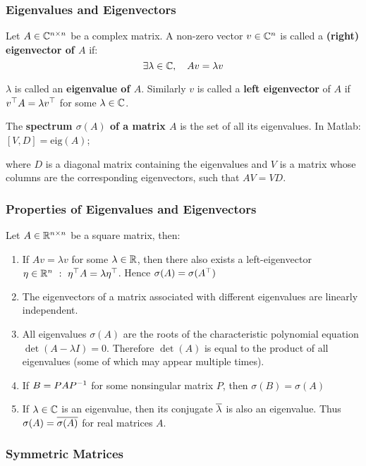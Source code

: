 \subsubsection{Eigenvalues and Eigenvectors}%
\label{ssub:eigenvalues_and_eigenvectors}

Let $A \in \mathbb{C}^{n \times n}$ be a complex matrix.
A non-zero vector $v \in \mathbb{C}^n$ is called a \textbf{(right) eigenvector of $A$} if:
	\[\exists \lambda \in \mathbb{C}, \quad Av = \lambda v\]

$\lambda$ is called an \textbf{eigenvalue of $A$}.
Similarly $v$ is called a \textbf{left eigenvector} of $A$ if
$v^{\top}A = \lambda v^{\top}$ for some $\lambda \in \mathbb{C}$.

The \textbf{spectrum $\sigma(A)$ of a matrix $A$} is the set of all its eigenvalues.
In Matlab: $[V,D] = \text{eig} (A)$;

where $D$ is a diagonal matrix containing the eigenvalues and
$V$ is a matrix whose columns are the corresponding eigenvectors,
such that $AV = VD$.


\subsubsection{Properties of Eigenvalues and Eigenvectors}%
\label{ssub:properties_of_eigenvalues_and_eigenvectors}

Let $A \in \mathbb{R}^{n \times n}$ be a square matrix, then:
\begin{enumerate}
	\item If $Av = \lambda v$ for some $\lambda \in \mathbb{R}$, then there also exists a
		left-eigenvector $\eta \in \Rn \ : \ \tr{\eta}A = \lambda \tr{\eta}$.
		Hence $\sigma(A) = \sigma(A^{\top})$
	\item The eigenvectors of a matrix associated with different
		eigenvalues are linearly independent.
	\item All eigenvalues $\sigma(A)$ are the roots of the characteristic
		polynomial equation $\det(A - \lambda I) = 0$.
		Therefore $\det(A)$ is equal to the product of all eigenvalues
		(some of which may appear multiple times).
	\item If $B = PAP^{-1}$ for some nonsingular matrix $P$,
		then $\sigma(B) = \sigma(A)$
	\item If $\lambda \in \mathbb{C}$ is an eigenvalue, then its conjugate
		$\overline{\lambda}$ is also an eigenvalue.
		Thus $\sigma(A) = \overline{\sigma(A)}$ for real matrices $A$.
\end{enumerate}


\subsubsection{Symmetric Matrices}%
\label{ssub:symmetric_matrices}

